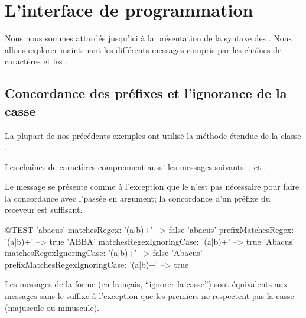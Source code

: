 \documentclass[a4paper,10pt,twoside]{book}
\begin{document}
{\section{L'interface de programmation \pkgregex}

Nous nous sommes attardés jusqu'ici à la présentation de la syntaxe
des \expregs. Nous allons explorer maintenant les différents messages
compris par les chaînes de caractères et les \expregs.

\subsection{Concordance des préfixes et l'ignorance de la casse}

La plupart de nos précédents exemples ont utilisé la méthode étendue
 de la classe .

Les chaînes de caractères comprennent aussi les messages suivants:
,  et
.

Le message  se présente comme
 à l'exception que le 
n'est pas nécessaire pour faire la concordance avec l'\expreg passée
en argument; la concordance d'un préfixe du receveur est suffisant.
\begin{code}{@TEST}
'abacus' matchesRegex: '(a|b)+'                                --> false
'abacus' prefixMatchesRegex: '(a|b)+'                       --> true
'ABBA' matchesRegexIgnoringCase: '(a|b)+'            --> true
'Abacus' matchesRegexIgnoringCase: '(a|b)+'          --> false
'Abacus' prefixMatchesRegexIgnoringCase: '(a|b)+' --> true
\end{code}

Les messages de la forme  (en français,
  ``ignorer la casse'') sont équivalents aux messages sans le suffixe
  à l'exception que les premiers ne respectent pas la casse (majuscule
ou minuscule).

}
\end{document}
